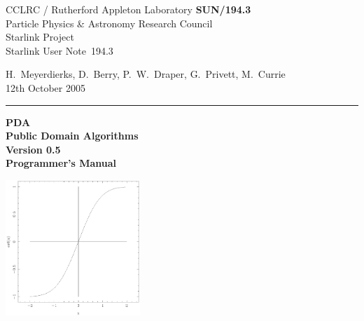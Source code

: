 \documentclass[11pt,twoside]{article}
\newcommand{\stardoccategory}  {Starlink User Note}
\newcommand{\stardocinitials}  {SUN}
\newcommand{\stardocnumber}    {194.3}
\newcommand{\stardocauthors}   {H.\ Meyerdierks, D.\ Berry, P.\ W.\ Draper, G.\ Privett, M.\ Currie }
\newcommand{\stardocdate}      {12th October 2005}
\newcommand{\stardoctitle}     {PDA \\ [\latex{1ex}]
                                Public Domain Algorithms}
\newcommand{\stardocversion}   {Version 0.5}
\newcommand{\stardocmanual}    {Programmer's Manual}
\newcommand{\stardocname}{\stardocinitials /\stardocnumber}
\newenvironment{latexonly}{}{}
\newcommand{\latex}[1]{#1}
\begin{document}
\thispagestyle{empty}

\begin{latexonly}
   CCLRC / {\sc Rutherford Appleton Laboratory} \hfill {\bf \stardocname}\\
   {\large Particle Physics \& Astronomy Research Council}\\
   {\large Starlink Project\\}
   {\large \stardoccategory\ \stardocnumber}
   \begin{flushright}
   \stardocauthors\\
   \stardocdate
   \end{flushright}
   \vspace{-4mm}
   \rule{\textwidth}{0.5mm}
   \vspace{5mm}
   \begin{center}
   {\Huge\bf  \stardoctitle \\ [2.5ex]}
   {\LARGE\bf \stardocversion \\ [4ex]}
   {\Huge\bf  \stardocmanual}
   \end{center}
   \vspace{5mm}

   \begin{center}
   \includegraphics[width=2.0in]{sun194_1.eps}
   \end{center}

\end{latexonly}
\end{document}
